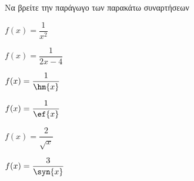 Να βρείτε την παράγωγο των παρακάτω συναρτήσεων
\begin{multicols}{2}
\begin{alist}
\item $ f(x)=\dfrac{1}{x^2} $
\item $ f(x)=\dfrac{1}{2x-4} $
\item $ f(x)=\dfrac{1}{\hm{x}} $
\item $ f(x)=\dfrac{1}{\ef{x}} $
\item $ f(x)=\dfrac{2}{\sqrt{x}} $
\item $ f(x)=\dfrac{3}{\syn{x}} $
\end{alist}
\end{multicols}
